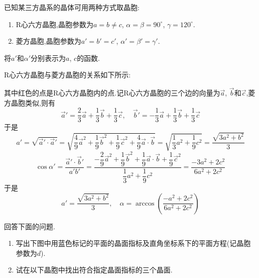 \documentclass{ctexart}
\begin{document}
\begin{homework}[6.]
    已知某三方晶系的晶体可用两种方式取晶胞:
    \begin{enumerate}[label=\tbf{(\arabic*)}]
        \item R心六方晶胞,晶胞参数为$a=b\neq c$, $\alpha=\beta=90^\circ$, $\gamma=120^\circ$.
        \item 菱方晶胞,晶胞参数为$a'=b'=c'$, $\alpha'=\beta'=\gamma'$.
    \end{enumerate}
    将$a'$和$\alpha'$分别表示为$a$, $c$的函数.
\end{homework}
\begin{solution}
    R心六方晶胞与菱方晶胞的关系如下所示:
    \begin{figure}[H]\centering
        
    \end{figure}
    其中红色的点是R心六方晶胞内的点.记R心六方晶胞的三个边的向量为$\vec{a}$, $\vec{b}$和$\vec{c}$,菱方晶胞类似,则有
    \[\vec{a}'=\dfrac23\vec{a}+\dfrac13\vec{b}+\dfrac13\vec{c},\quad\vec{b}'=-\dfrac13\vec{a}+\dfrac13\vec{b}+\dfrac13\vec{c}\]
    于是
    \[a'=\sqrt{\vec{a}'\cdot\vec{a}'}=\sqrt{\dfrac49\vec{a}^2+\dfrac19\vec{b}^2+\dfrac19\vec{c}^2+\dfrac49\vec{a}\cdot\vec{b}}=\sqrt{\dfrac{1}{3}a^2+\dfrac19c^2}=\dfrac{\sqrt{3a^2+b^2}}{3}\]
    \[\cos\alpha'=\dfrac{\vec{a}'\cdot\vec{b}'}{a'b'}=\dfrac{-\dfrac{2}{9}\vec{a}^2+\dfrac19\vec{b}^2+\dfrac19\vec{a}\cdot\vec{b}+\dfrac19\vec{c}^2}{\dfrac{1}{3}a^2+\dfrac{1}{9}c^2}=\dfrac{-3a^2+2c^2}{6a^2+2c^2}\]
    于是
    \[a'=\dfrac{\sqrt{3a^2+b^2}}{3},\quad\alpha=\arccos\left(\dfrac{-a^2+2c^2}{6a^2+2c^2}\right)\]
\end{solution}
\begin{homework}[7.]
    回答下面的问题.
    \begin{enumerate}[label=\tbf{(\alph*)}]
        \item 写出下图中用蓝色标记的平面的晶面指标及直角坐标系下的平面方程(记晶胞参数为$d$).
        \item 试在以下晶胞中找出符合指定晶面指标的三个晶面.
    \end{enumerate}
\end{homework}
\end{document}
